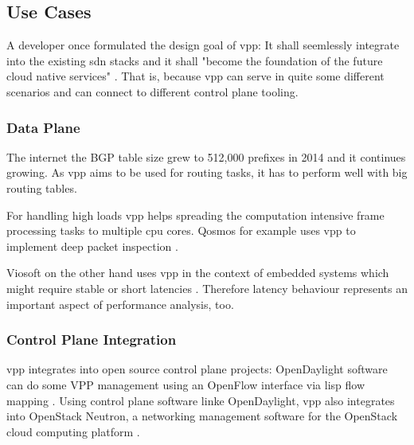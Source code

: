 \subsection{Use Cases}


A developer once formulated the design goal of \Ac{vpp}: It shall
seemlessly integrate into the existing \Ac{sdn} stacks and it shall
"become the foundation of the future cloud native services"
\cite{florincoras}. That is, because \Ac{vpp} can serve in quite some
different scenarios and can connect to different control plane
tooling.

\subsubsection{Data Plane}


The internet the BGP table size grew to 512,000 prefixes in 2014 and
it continues growing. As \Ac{vpp} aims to be used for routing tasks,
it has to perform well with big routing tables. \cite{bgphelp:size}


For handling high loads \Ac{vpp} helps spreading the computation
intensive frame processing tasks to multiple cpu cores. Qosmos for
example uses \Ac{vpp} to implement deep packet inspection
\cite{qosmos}.


Viosoft on the other hand uses \Ac{vpp} in the context of embedded
systems which might require stable or short latencies \cite{viosoft}.
Therefore latency behaviour represents an important aspect of
performance analysis, too.


\subsubsection{Control Plane Integration}

\Ac{vpp} integrates into open source control plane projects:
OpenDaylight software can do some VPP management using an OpenFlow
interface via \Ac{lisp} flow mapping \cite{opendaylight:lisp}. Using
control plane software linke OpenDaylight, \Ac{vpp} also integrates
into OpenStack Neutron, a networking management software for the
OpenStack cloud computing platform \cite{fdio:integration}.

